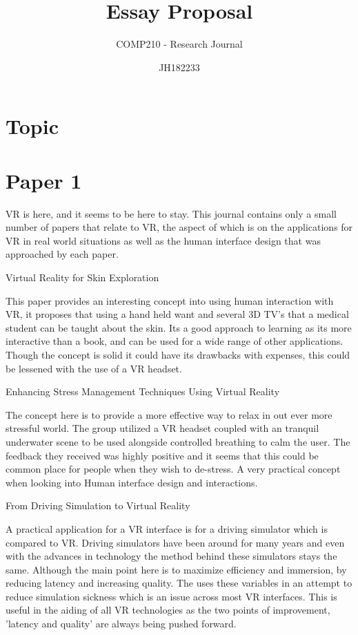 \documentclass{scrartcl}
\title{Essay Proposal}
\subtitle{COMP210 - Research Journal}
\author{JH182233}
\begin{document}
	
	
	\maketitle
	\section*{Topic}
	
	
	\section*{Paper 1}
	\begin{description}
		VR is here, and it seems to be here to stay. This journal contains only a small number of papers that relate to VR, the aspect of which is on the applications for VR in real world situations as well as the human interface design that was approached by each paper.
		
		\item[Title:] Virtual Reality for Skin Exploration
		\item[Citation:] \cite{Vazquez}
		This paper provides an interesting concept into using human interaction with VR, it proposes that using a hand held want and several 3D TV's that a medical student can be taught about the skin. Its a good approach to learning as its more interactive than a book, and can be used for a wide range of other applications. Though the concept is solid it could have its drawbacks with expenses, this could be lessened with the use of a VR headset. 
	
		\item[Title:] Enhancing Stress Management Techniques Using Virtual Reality
		\item[Citation:] \cite{Soyka}
		 The concept here is to provide a more effective way to relax in out ever more stressful world. The group utilized a VR headset coupled with an tranquil underwater scene to be used alongside controlled breathing to calm the user. The feedback they received was highly positive and it seems that this could be common place for people when they wish to de-stress. A very practical concept when looking into Human interface design and interactions.

		\item[Title:] From Driving Simulation to Virtual Reality
		\item[Citation:] \cite{Kemeny}
		 A practical application for a VR interface is for a driving simulator which is compared to VR. Driving simulators have been around for many years and even with the advances in technology the method behind these simulators stays the same. Although the main point here is to maximize efficiency and immersion, by reducing latency and increasing quality. The uses these variables in an attempt to reduce simulation sickness which is an issue across most VR interfaces. This is useful in the aiding of all VR technologies as the two points of improvement, 'latency and quality' are always being pushed forward.


\end{description}
\end{document}
